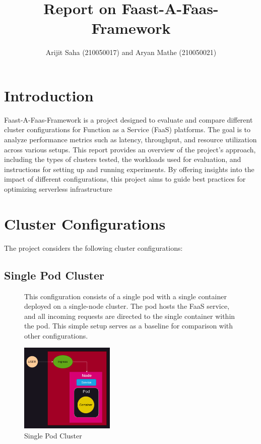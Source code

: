 \documentclass{article}
\title{Report on Faast-A-Faas-Framework}
\author{Arijit Saha (210050017) and Aryan Mathe (210050021)}
\date{}
\begin{document}
\maketitle

\section{Introduction}
Faast-A-Faas-Framework is a project designed to evaluate and compare different
cluster configurations for Function as a Service (FaaS) platforms. The goal is
to analyze performance metrics such as latency, throughput, and resource
utilization across various setups. This report provides an overview of the
project's approach, including the types of clusters tested, the workloads used
for evaluation, and instructions for setting up and running experiments. By
offering insights into the impact of different configurations, this project
aims to guide best practices for optimizing serverless infrastructure

\section{Cluster Configurations}
The project considers the following cluster configurations:

\subsection{Single Pod Cluster}
\nobreak
\begin{figure}
    \begin{minipage}[u]{0.6\textwidth}
        This configuration consists of a single pod with a single container deployed on
        a single-node cluster. The pod hosts the FaaS service, and all incoming
        requests are directed to the single container within the pod. This simple setup
        serves as a baseline for comparison with other configurations.
    \end{minipage}%
    \hfill
    \begin{minipage}[u]{0.4\textwidth}
        \centering
        \includegraphics[width=0.4\textwidth]{../images/single_pod.png}
        \caption{Single Pod Cluster}
        \label{fig:single_pod_cluster}
    \end{minipage}
\end{figure}
\end{document}
